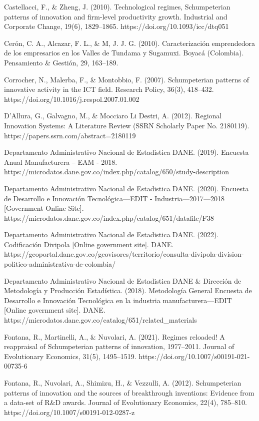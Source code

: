 \documentclass[12pt,a4paper]{article}
\begin{document}
{Castellacci, F., \& Zheng, J. (2010). Technological regimes, Schumpeterian patterns of innovation and firm-level productivity growth. Industrial and Corporate Change, 19(6), 1829–1865. https://doi.org/10.1093/icc/dtq051

Cerón, C. A., Alcazar, F. L., \& M, J. J. G. (2010). Caracterización emprendedora de los empresarios en los Valles de Tundama y Sugamuxi. Boyacá (Colombia). Pensamiento \& Gestión, 29, 163–189.

Corrocher, N., Malerba, F., \& Montobbio, F. (2007). Schumpeterian patterns of innovative activity in the ICT field. Research Policy, 36(3), 418–432. https://doi.org/10.1016/j.respol.2007.01.002

D’Allura, G., Galvagno, M., \& Mocciaro Li Destri, A. (2012). Regional Innovation Systems: A Literature Review (SSRN Scholarly Paper No. 2180119). https://papers.ssrn.com/abstract=2180119

Departamento Administrativo Nacional de Estadistica DANE. (2019). Encuesta Anual Manufacturera – EAM - 2018. https://microdatos.dane.gov.co/index.php/catalog/650/study-description

Departamento Administrativo Nacional de Estadistica DANE. (2020). Encuesta de Desarrollo e Innovación Tecnológica—EDIT - Industria—2017—2018 [Government Online Site]. https://microdatos.dane.gov.co/index.php/catalog/651/datafile/F38

Departamento Administrativo Nacional de Estadistica DANE. (2022). Codificación Divipola [Online government site]. DANE. https://geoportal.dane.gov.co/geovisores/territorio/consulta-divipola-division-politico-administrativa-de-colombia/

Departamento Administrativo Nacional de Estadistica DANE \& Dirección de Metodología y Producción Estadística. (2018). Metodología General Encuesta de Desarrollo e Innovación Tecnológica en la industria manufacturera—EDIT [Online government site]. DANE. https://microdatos.dane.gov.co/catalog/651/related\_materials

Fontana, R., Martinelli, A., \& Nuvolari, A. (2021). Regimes reloaded! A reappraisal of Schumpeterian patterns of innovation, 1977–2011. Journal of Evolutionary Economics, 31(5), 1495–1519. https://doi.org/10.1007/s00191-021-00735-6

Fontana, R., Nuvolari, A., Shimizu, H., \& Vezzulli, A. (2012). Schumpeterian patterns of innovation and the sources of breakthrough inventions: Evidence from a data-set of R\&D awards. Journal of Evolutionary Economics, 22(4), 785–810. https://doi.org/10.1007/s00191-012-0287-z

}
\end{document}
